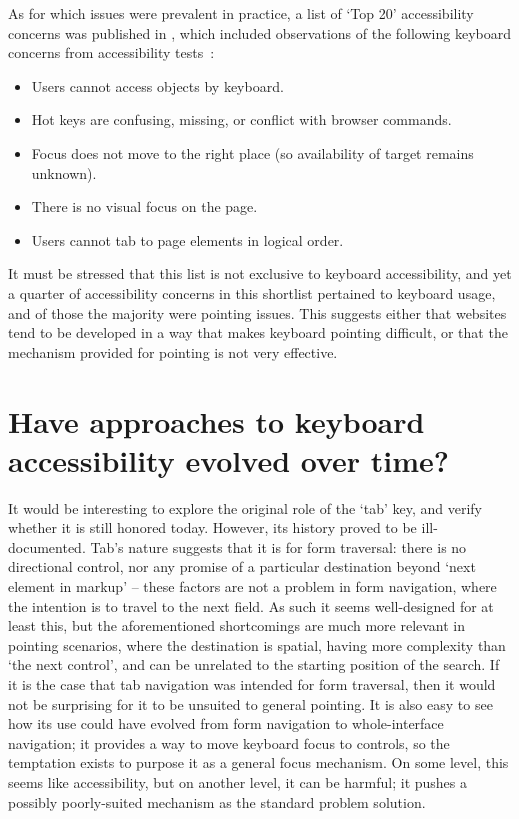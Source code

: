 \documentclass[a4paper, 12pt]{report}
\begin{document}
As for which issues were prevalent in practice, a list of `Top 20' accessibility concerns was published in \citeyear{hoffman2005emerging}, which included observations of the following keyboard concerns from accessibility tests~\cite{hoffman2005emerging}:
\begin{itemize}
\item Users cannot access objects by keyboard.
\item Hot keys are confusing, missing, or conflict with browser commands.
\item Focus does not move to the right place (so availability of target remains unknown).
\item There is no visual focus on the page.
\item Users cannot tab to page elements in logical order.
\end{itemize}

It must be stressed that this list is not exclusive to keyboard accessibility, and yet a quarter of accessibility concerns in this shortlist pertained to keyboard usage, and of those the majority were pointing issues. This suggests either that websites tend to be developed in a way that makes keyboard pointing difficult, or that the mechanism provided for pointing is not very effective.
\section{Have approaches to keyboard accessibility evolved over time?}
It would be interesting to explore the original role of the `tab' key, and verify whether it is still honored today. However, its history proved to be ill-documented. Tab's nature suggests that it is for form traversal: there is no directional control, nor any promise of a particular destination beyond `next element in markup' -- these factors are not a problem in form navigation, where the intention is to travel to the next field. As such it seems well-designed for at least this, but the aforementioned shortcomings are much more relevant in pointing scenarios, where the destination is spatial, having more complexity than `the next control', and can be unrelated to the starting position of the search.
If it is the case that tab navigation was intended for form traversal, then it would not be surprising for it to be unsuited to general pointing. It is also easy to see how its use could have evolved from form navigation to whole-interface navigation; it provides a way to move keyboard focus to controls, so the temptation exists to purpose it as a general focus mechanism. On some level, this seems like accessibility, but on another level, it can be harmful; it pushes a possibly poorly-suited mechanism as the standard problem solution.
\end{document}
